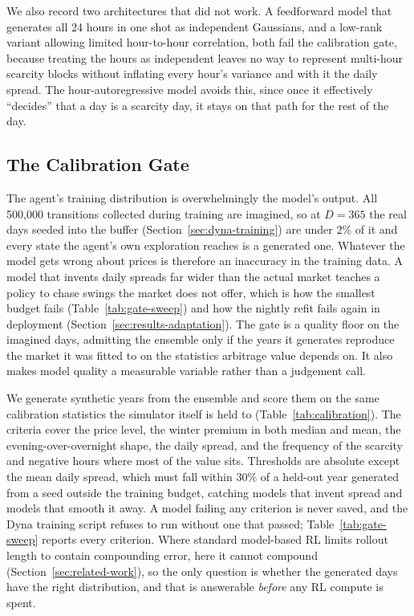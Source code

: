 \documentclass[conference]{IEEEtran}
\begin{document}
We also record two architectures that did not work. A feedforward model that generates all 24 hours in one shot as independent Gaussians, and a low-rank variant allowing limited hour-to-hour correlation, both fail the calibration gate, because treating the hours as independent leaves no way to represent multi-hour scarcity blocks without inflating every hour's variance and with it the daily spread. The hour-autoregressive model avoids this, since once it effectively ``decides'' that a day is a scarcity day, it stays on that path for the rest of the day.

\subsection{The Calibration Gate}
\label{sec:calibration-gate}

The agent's training distribution is overwhelmingly the model's output. All 500{,}000 transitions collected during training are imagined, so at $D{=}365$ the real days seeded into the buffer (Section~\ref{sec:dyna-training}) are under 2\% of it and every state the agent's own exploration reaches is a generated one. Whatever the model gets wrong about prices is therefore an inaccuracy in the training data. A model that invents daily spreads far wider than the actual market teaches a policy to chase swings the market does not offer, which is how the smallest budget fails (Table~\ref{tab:gate-sweep}) and how the nightly refit fails again in deployment (Section~\ref{sec:results-adaptation}). The gate is a quality floor on the imagined days, admitting the ensemble only if the years it generates reproduce the market it was fitted to on the statistics arbitrage value depends on. It also makes model quality a measurable variable rather than a judgement call.

We generate synthetic years from the ensemble and score them on the same calibration statistics the simulator itself is held to (Table~\ref{tab:calibration}). The criteria cover the price level, the winter premium in both median and mean, the evening-over-overnight shape, the daily spread, and the frequency of the scarcity and negative hours where most of the value sits. Thresholds are absolute except the mean daily spread, which must fall within 30\% of a held-out year generated from a seed outside the training budget, catching models that invent spread and models that smooth it away. A model failing any criterion is never saved, and the Dyna training script refuses to run without one that passed; Table~\ref{tab:gate-sweep} reports every criterion. Where standard model-based RL limits rollout length to contain compounding error, here it cannot compound (Section~\ref{sec:related-work}), so the only question is whether the generated days have the right distribution, and that is answerable \emph{before} any RL compute is spent.
\end{document}
